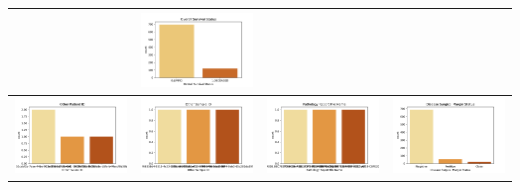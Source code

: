 \begin{center}
\begin{tabular}{ |c|c|c|c| }
		& \includegraphics[width=.25\textwidth]{NOTEBOOK/IMAGENES_CRUDAS/80} 
		\\  \hline
		\includegraphics[width=.25\textwidth]{NOTEBOOK/IMAGENES_CRUDAS/81} 
		& \includegraphics[width=.25\textwidth]{NOTEBOOK/IMAGENES_CRUDAS/82} 
		& \includegraphics[width=.25\textwidth]{NOTEBOOK/IMAGENES_CRUDAS/83} 
		& \includegraphics[width=.25\textwidth]{NOTEBOOK/IMAGENES_CRUDAS/84} 
		\\  \hline           
	\end{tabular} 
\end{center} 



